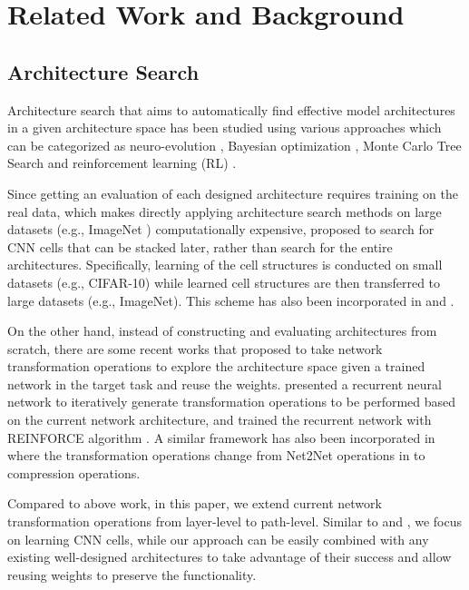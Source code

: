\documentclass{article}
\begin{document}
\section{Related Work and Background}
\subsection{Architecture Search}\label{sec:arch_search_related}
Architecture search that aims to automatically find effective model architectures in a given architecture space has been studied using various approaches which can be categorized as neuro-evolution \cite{real2017large,liu2017hierarchical}, Bayesian optimization \cite{domhan2015speeding,mendoza2016towards}, Monte Carlo Tree Search \cite{negrinho2017deeparchitect} and reinforcement learning (RL) \cite{zoph2016neural,baker2016designing,zhong2017practical,zoph2017learning}.

Since getting an evaluation of each designed architecture requires training on the real data, which makes directly applying architecture search methods on large datasets (e.g., ImageNet \cite{deng2009imagenet}) computationally expensive, \citet{zoph2017learning} proposed to search for CNN cells that can be stacked later, rather than search for the entire architectures. Specifically, learning of the cell structures is conducted on small datasets (e.g., CIFAR-10) while learned cell structures are then transferred to large datasets (e.g., ImageNet). This scheme has also been incorporated in \citet{zhong2017practical} and \citet{liu2017hierarchical}. 

On the other hand, instead of constructing and evaluating architectures from scratch, there are some recent works that proposed to take network transformation operations to explore the architecture space given a trained network in the target task and reuse the weights. \citet{cai2018efficient} presented a recurrent neural network to iteratively generate transformation operations to be performed based on the current network architecture, and trained the recurrent network with REINFORCE algorithm \cite{williams1992simple}. A similar framework has also been incorporated in \citet{ashok2017n2n} where the transformation operations change from Net2Net operations in \citet{cai2018efficient} to compression operations. 

Compared to above work, in this paper, we extend current network transformation operations from layer-level to path-level. Similar to \citet{zoph2017learning} and \citet{zhong2017practical}, we focus on learning CNN cells, while our approach can be easily combined with any existing well-designed architectures to take advantage of their success and allow reusing weights to preserve the functionality. 
 
\end{document}
